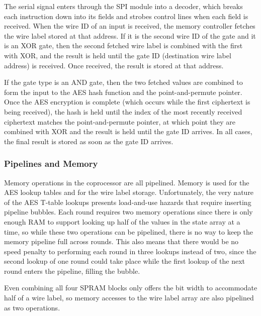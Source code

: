 The serial signal enters through the SPI module into a decoder, which breaks each instruction down into its fields and strobes control lines when each field is received. When the wire ID of an input is received, the memory controller fetches the wire label stored at that address. If it is the second wire ID of the gate and it is an XOR gate, then the second fetched wire label is combined with the first with XOR, and the result is held until the gate ID (destination wire label address) is received. Once received, the result is stored at that address.

If the gate type is an AND gate, then the two fetched values are combined to form the input to the AES hash function and the point-and-permute pointer. Once the AES encryption is complete (which occurs while the first ciphertext is being received), the hash is held until the index of the most recently received ciphertext matches the point-and-permute pointer, at which point they are combined with XOR and the result is held until the gate ID arrives. In all cases, the final result is stored as soon as the gate ID arrives.


\subsubsection{Pipelines and Memory}
Memory operations in the coprocessor are all pipelined. Memory is used for the AES lookup tables and for the wire label storage. Unfortunately, the very nature of the AES T-table lookups presents load-and-use hazards that require inserting pipeline bubbles. Each round requires two memory operations since there is only enough RAM to support looking up half of the values in the state array at a time, so while these two operations can be pipelined, there is no way to keep the memory pipeline full across rounds. This also means that there would be no speed penalty to performing each round in three lookups instead of two, since the second lookup of one round could take place while the first lookup of the next round enters the pipeline, filling the bubble.

Even combining all four SPRAM blocks only offers the bit width to accommodate half of a wire label, so memory accesses to the wire label array are also pipelined as two operations.


